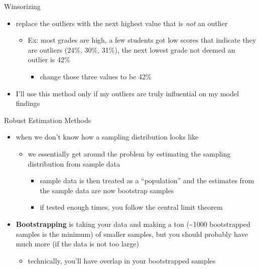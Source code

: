 \documentclass[
  ignorenonframetext,
]{beamer}
\providecommand{\tightlist}{%
  \setlength{\itemsep}{0pt}\setlength{\parskip}{0pt}}
\begin{document}
\begin{frame}{Winsorizing}
\protect\hypertarget{winsorizing}{}
\begin{itemize}
\item
  replace the outliers with the next highest value that is \emph{not} an
  outlier

  \begin{itemize}
  \item
    Ex: most grades are high, a few students got low scores that
    indicate they are outliers (24\%, 30\%, 31\%), the next lowest grade
    not deemed an outlier is 42\%

    \begin{itemize}
    \tightlist
    \item
      change those three values to be 42\%
    \end{itemize}
  \end{itemize}
\item
  I'll use this method only if my outliers are truly influential on my
  model findings
\end{itemize}
\end{frame}

\begin{frame}{Robust Estimation Methods}
\protect\hypertarget{robust-estimation-methods}{}
\begin{itemize}
\item
  when we don't know how a sampling distribution looks like

  \begin{itemize}
  \item
    we essentially get around the problem by estimating the sampling
    distribution from sample data

    \begin{itemize}
    \item
      sample data is then treated as a ``population'' and the estimates
      from the sample data are now bootstrap samples
    \item
      if tested enough times, you follow the central limit theorem
    \end{itemize}
  \end{itemize}
\item
  \textbf{Bootstrapping} is taking your data and making a ton
  (\textasciitilde1000 bootstrapped samples is the minimum) of smaller
  samples, but you should probably have much more (if the data is not
  too large)

  \begin{itemize}
  \tightlist
  \item
    technically, you'll have overlap in your bootstrapped samples
  \end{itemize}
\end{itemize}
\end{frame}
\end{document}
